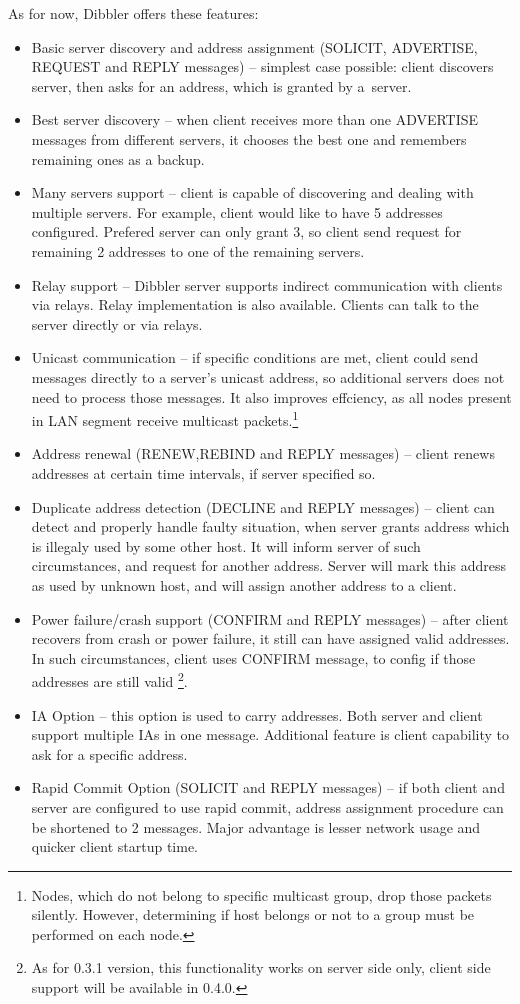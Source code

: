 As for now, Dibbler offers these features:
\begin{itemize}
\item Basic server discovery and address assignment (SOLICIT,
  ADVERTISE, REQUEST and REPLY messages) -- simplest case possible:
  client discovers server, then asks for an address, which is granted
  by a~server.
\item Best server discovery -- when client receives more than one
  ADVERTISE messages from different servers, it chooses the best one
  and remembers remaining ones as a backup.
\item Many servers support -- client is capable of discovering and
  dealing with multiple servers. For example, client would like to
  have 5 addresses configured. Prefered server can only grant 3, so
  client send request for remaining 2 addresses to one of the
  remaining servers.
\item Relay support -- Dibbler server supports indirect
  communication with clients via relays. Relay implementation is also
  available. Clients can talk to the server directly or via relays.
\item Unicast communication -- if specific conditions are met, client
  could send messages directly to a server's unicast address, so
  additional servers does not need to process those messages. It also
  improves effciency, as all nodes present in LAN segment receive
  multicast packets.\footnote{Nodes, which do not belong to specific
    multicast group, drop those packets silently. However, determining
    if host belongs or not to a group must be performed on each node.}
\item Address renewal (RENEW,REBIND and REPLY messages) -- client renews
  addresses at certain time intervals, if server specified so.
\item Duplicate address detection (DECLINE and REPLY messages) -- client
  can detect and properly handle faulty situation, when server grants
  address which is illegaly used by some other host. It will inform
  server of such circumstances, and request for another
  address. Server will mark this address as used by unknown host, and
  will assign another address to a client.
\item Power failure/crash support (CONFIRM and REPLY messages) -- after
  client recovers from crash or power failure, it still can have
  assigned valid addresses. In such circumstances, client uses CONFIRM
  message, to config if those addresses are still valid%
  \footnote{As for 0.3.1 version, this functionality works on server side only,
  client side support will be available in 0.4.0.}.
\item IA Option -- this option is used to carry addresses. Both server
  and client support multiple IAs in one message. Additional feature
  is client capability to ask for a specific address.
\item Rapid Commit Option (SOLICIT and REPLY messages) -- if both
  client and server are configured to use rapid commit, address
  assignment procedure can be shortened to 2 messages. Major
  advantage is lesser network usage and quicker client startup time.
\end{itemize}

